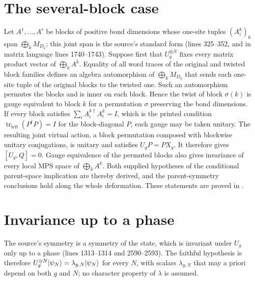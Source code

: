 \documentclass{article}
\begin{document}
\section{The several-block case}
Let $A^1,\dots,A^r$ be blocks of positive bond dimensions whose one-site
tuples $(A^k_i)_k$ span $\bigoplus_k M_{D_k}$; this joint span is the
source's standard form (lines 325--352, and in matrix language lines
1740--1743). Suppose first that $U_g^{\otimes N}$ fixes
every matrix product vector of $\bigoplus_k A^k$. Equality of all word
traces of the original and twisted block families defines an algebra
automorphism of $\bigoplus_k M_{D_k}$ that sends each one-site tuple of
the original blocks to the twisted one. Such an automorphism permutes the
blocks and is inner on each block. Hence the twist of block $\sigma(k)$
is gauge equivalent to block $k$ for a permutation $\sigma$ preserving
the bond dimensions. If every block satisfies $\sum_i A^{k\dagger}_i
A^k_i=I$, which is the printed condition
$\operatorname{tr}_{\mathrm{left}}(P^\dagger P)=I$ for the
block-diagonal $P$, each gauge may be taken unitary. The resulting joint
virtual action, a block permutation composed with blockwise unitary
conjugations, is unitary and satisfies $U_gP=PX_g$. It therefore gives
$[U_g,Q]=0$. Gauge equivalence of the permuted blocks also gives
invariance of every local MPS space of $\bigoplus_k A^k$. Both supplied
hypotheses of the conditional parent-space implication are thereby derived,
and the parent-symmetry conclusions hold along the whole deformation.
These statements are proved in
.

\section{Invariance up to a phase}
The source's symmetry is a symmetry of the state, which is invariant under
$U_g$ only up to a phase (lines 1313--1314 and 2590--2593). The faithful hypothesis is therefore
$U_g^{\otimes N}|\psi_N\rangle=\lambda_{g,N}|\psi_N\rangle$ for every $N$, with
scalars $\lambda_{g,N}$ that may a priori depend on both $g$ and $N$; no
character property of $\lambda$ is assumed.
\end{document}
